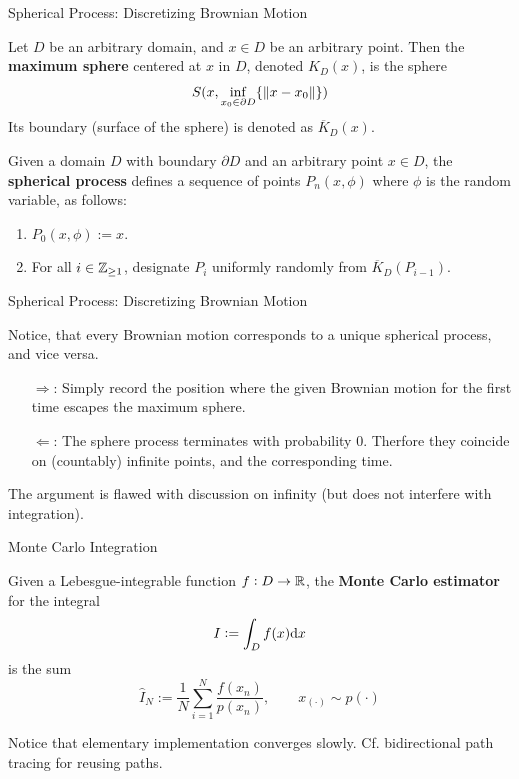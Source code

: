 \documentclass{beamer}
\begin{document}
\begin{frame}{Spherical Process: Discretizing Brownian Motion}

	\begin{definition}
		Let $D$ be an arbitrary domain, and $x \in D$ be an arbitrary point. Then the \textbf{maximum sphere} centered at $x$ in $D$, denoted ${K}_D(x)$, is the sphere
		\[
			S(x, \inf_{x_0 \in \partial D} \{ \left\|x - x_0\right\| \})
		\]
		Its boundary (surface of the sphere) is denoted as $\overline{{K}}_D(x)$.
	\end{definition}
	\horzline

	\begin{definition}
		Given a domain $D$ with boundary $\partial D$ and an arbitrary point $x \in D$, the \textbf{spherical process} defines a sequence of points $P_n(x, \phi)$ where $\phi$ is the random variable, as follows:
		\begin{enumerate}
			\item $P_0(x, \phi) := x$.
			\item For all $i \in \mathbb{Z}_{\geq 1}$, designate $P_i$ uniformly randomly from $\overline{{K}}_D (P_{i-1})$. 
		\end{enumerate}
	\end{definition}
	\horzline

\end{frame}

\begin{frame}{Spherical Process: Discretizing Brownian Motion}
	
	Notice, that every Brownian motion corresponds to a unique spherical process, and vice versa.

	\begin{enumerate}
		\item[$\Rightarrow$:] Simply record the position where the given Brownian motion for the first time escapes the maximum sphere.
		\item[$\Leftarrow$:] The sphere process terminates with probability 0. Therfore they coincide on (countably) infinite points, and the corresponding time.
	\end{enumerate}

	The argument is flawed with discussion on infinity (but does not interfere with integration).

\end{frame}

\begin{frame}{Monte Carlo Integration}

	\begin{definition}
		Given a Lebesgue-integrable function $f: D \to \mathbb{R}$, the \textbf{Monte Carlo estimator} for the integral
		\[
			I := \int_D f(x) \mathrm{d} x
		\]
		is the sum
		\[
			\hat{I}_N := \frac{1}{N} \sum_{i = 1}^N \frac{f(x_n)}{p(x_n)}, \qquad x_{(\cdot)} \sim p(\cdot)
		\]
	\end{definition}
	\horzline

	Notice that elementary implementation converges slowly. Cf. bidirectional path tracing for reusing paths.
\end{frame}
\end{document}
